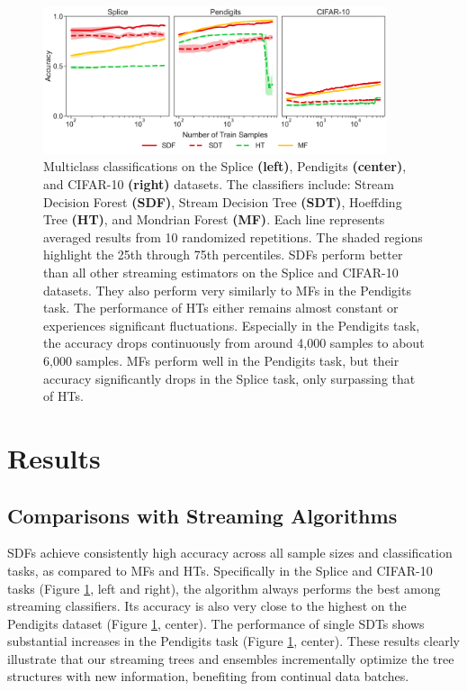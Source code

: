 \begin{figure}[!htb]
\centering
\includegraphics[width=0.9\textwidth]{select_acc_stream}
  \caption{Multiclass classifications on the Splice \textbf{(left)}, Pendigits \textbf{(center)}, and CIFAR-10 \textbf{(right)} datasets. The classifiers include: Stream Decision Forest \textbf{(SDF)}, Stream Decision Tree \textbf{(SDT)}, Hoeffding Tree \textbf{(HT)}, and Mondrian Forest \textbf{(MF)}. 
  Each line represents averaged results from 10 randomized repetitions. The shaded regions highlight the 25th through 75th percentiles. SDFs perform better than all other streaming estimators on the Splice and CIFAR-10 datasets. They also perform very similarly to MFs in the Pendigits task. The performance of HTs either remains almost constant or experiences significant fluctuations. Especially in the Pendigits task, the accuracy drops continuously from around 4,000 samples to about 6,000 samples. MFs perform well in the Pendigits task, but their accuracy significantly drops in the Splice task, only surpassing that of HTs.
  }
\label{fig:select_acc_stream}
\end{figure}

\section{Results}
\label{results}

\subsection{Comparisons with Streaming Algorithms}
\label{results:stream}
SDFs achieve consistently high accuracy across all sample sizes and classification tasks, as compared to MFs and HTs. Specifically in the Splice and CIFAR-10 tasks (Figure \ref{fig:select_acc_stream}, left and right), the algorithm always performs the best among streaming classifiers. Its accuracy is also very close to the highest on the Pendigits dataset (Figure \ref{fig:select_acc_stream}, center). 
The performance of single SDTs shows substantial increases in the Pendigits task (Figure \ref{fig:select_acc_stream}, center). 
These results clearly illustrate that our streaming trees and ensembles incrementally optimize the tree structures with new information, benefiting from continual data batches.

